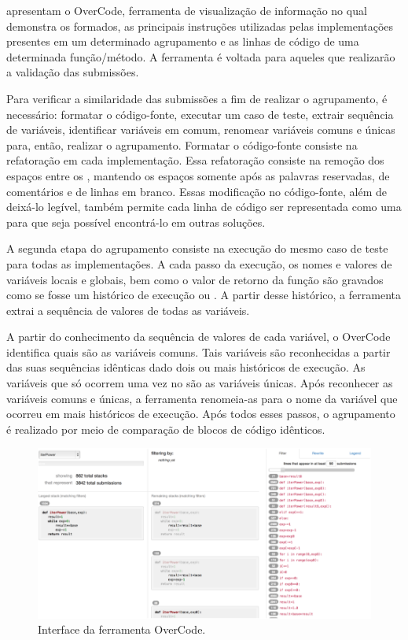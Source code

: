 	     apresentam o OverCode, ferramenta de visualização
	    de informação no qual demonstra os  formados, as principais
	    instruções utilizadas pelas implementações presentes em um determinado
	    agrupamento e as linhas de código de uma determinada função/método. A
	    ferramenta é voltada para aqueles que realizarão a validação das submissões.
	    
	    Para verificar a similaridade das submissões a fim de realizar o agrupamento,
	    é necessário: formatar o código-fonte, executar um caso de teste, extrair sequência
	    de variáveis, identificar variáveis em comum, renomear variáveis comuns e únicas
	    para, então, realizar o agrupamento. Formatar o código-fonte consiste na refatoração
	    em cada implementação. Essa refatoração consiste na remoção dos espaços entre os
	    , mantendo os espaços somente após as palavras reservadas, de
	    comentários e de linhas em branco. Essas modificação no código-fonte, além de
	    deixá-lo legível, também permite cada linha de código ser representada como
	    uma  para que seja possível encontrá-lo em outras soluções.
	    
	    A segunda etapa do agrupamento consiste na execução do mesmo caso de teste
	    para todas as implementações. A cada passo da execução, os nomes e valores de
	    variáveis locais e globais, bem como o valor de retorno da função são gravados
	    como se fosse um histórico de execução ou . A partir desse
	    histórico, a ferramenta extrai a sequência de valores de todas as variáveis.
	    
	    A partir do conhecimento da sequência de valores de cada variável, o OverCode
	    identifica quais são as variáveis comuns. Tais variáveis são reconhecidas a
	    partir das suas sequências idênticas dado dois ou mais históricos de execução.
	    As variáveis que só ocorrem uma vez no  são as variáveis únicas.
	    Após reconhecer as variáveis comuns e únicas, a ferramenta renomeia-as para o
	    nome da variável que ocorreu em mais históricos de execução. Após todos esses
	    passos, o agrupamento é realizado por meio de comparação de blocos de código
	    idênticos.
	    
	    \begin{figure}[ht]
	        \centering
	        \includegraphics[scale=0.4]{imagem/overCode.png}
	        \captionsetup{justification=centering}
	        \caption{Interface da ferramenta OverCode.}
	        \label{fig:interfaceOverCode}
	    \end{figure}
	    
